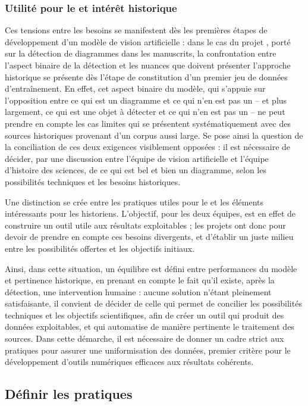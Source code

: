     \subsubsection{Utilité pour le \ml et intérêt historique}
	Ces tensions entre les besoins se manifestent dès les premières étapes de développement d'un modèle de vision artificielle : dans le cas du projet \eida, porté sur la détection de diagrammes dans les manuscrits, la confrontation entre l'aspect binaire de la détection et les nuances que doivent présenter l'approche historique se présente dès l'étape de constitution d'un premier jeu de données d'entraînement. En effet, cet aspect binaire du modèle, qui s'appuie sur l'opposition entre ce qui est un diagramme et ce qui n'en est pas un -- et plus largement, ce qui est une objet à détecter et ce qui n'en est pas un -- ne peut prendre en compte les cas limites qui se présentent systématiquement avec des sources historiques provenant d'un corpus aussi large. Se pose ainsi la question de la conciliation de ces deux exigences visiblement opposées : il est nécessaire de décider, par une discussion entre l'équipe de vision artificielle et l'équipe d'histoire des sciences, de ce qui est bel et bien un diagramme, selon les possibilités techniques et les besoins historiques.
	
	Une distinction se crée entre les pratiques utiles pour le \dl et les éléments intéressants pour les historiens. L'objectif, pour les deux équipes, est en effet de construire un outil utile aux résultats exploitables ; les projets ont donc pour devoir de prendre en compte ces besoins divergents, et d'établir un juste milieu entre les possibilités offertes et les objectifs initiaux. 
	
	Ainsi, dans cette situation, un équilibre est défini entre performances du modèle et pertinence historique, en prenant en compte le fait qu'il existe, après la détection, une intervention humaine : aucune solution n'étant pleinement satisfaisante, il convient de décider de celle qui permet de concilier les possibilités techniques et les objectifs scientifiques, afin de créer un outil qui produit des données exploitables, et qui automatise de manière pertinente le traitement des sources. Dans cette démarche, il est nécessaire de donner un cadre strict aux pratiques pour assurer une uniformisation des données, premier critère pour le développement d'outils numériques efficaces aux résultats cohérents.
    
\subsection{Définir les pratiques}
